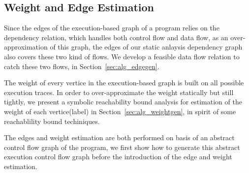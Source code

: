 
\subsection{Weight and Edge Estimation}
\label{sec:alg_weightedgegen}

Since the edges of the execution-based graph of a program relies on the dependency relation, which handles both control flow and data flow, as an over-approximation of this graph, the edges of our static anlaysis dependency graph also covers these two kind of flows. We develop a feasible data flow relation to catch these two flows, in Section~\ref{sec:alg_edgegen}.


The weight of every vertice in the execution-based graph is built on all possible execution traces.
In order to over-approximate the weight statically but still tightly, we present a symbolic reachability bound analysis for estimation of the weight of each vertice(label) in Section~\ref{sec:alg_weightgen},
in spirit of some reachablility bound techiniques.


The edges and weight estimation are both performed on basis of an abstract control flow graph of the program, we first show how to generate this abstract execution control flow graph before the introduction of  the edge and weight estimation.  

